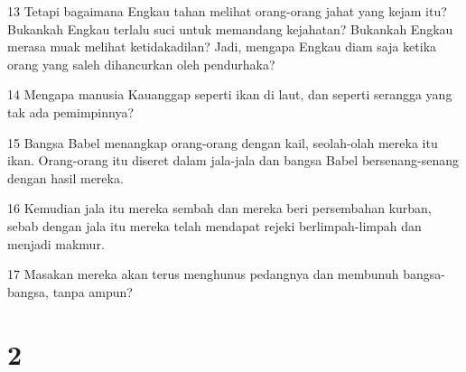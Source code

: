 \par 13 Tetapi bagaimana Engkau tahan melihat orang-orang jahat yang kejam itu? Bukankah Engkau terlalu suci untuk memandang kejahatan? Bukankah Engkau merasa muak melihat ketidakadilan? Jadi, mengapa Engkau diam saja ketika orang yang saleh dihancurkan oleh pendurhaka?
\par 14 Mengapa manusia Kauanggap seperti ikan di laut, dan seperti serangga yang tak ada pemimpinnya?
\par 15 Bangsa Babel menangkap orang-orang dengan kail, seolah-olah mereka itu ikan. Orang-orang itu diseret dalam jala-jala dan bangsa Babel bersenang-senang dengan hasil mereka.
\par 16 Kemudian jala itu mereka sembah dan mereka beri persembahan kurban, sebab dengan jala itu mereka telah mendapat rejeki berlimpah-limpah dan menjadi makmur.
\par 17 Masakan mereka akan terus menghunus pedangnya dan membunuh bangsa-bangsa, tanpa ampun?

\chapter{2}

